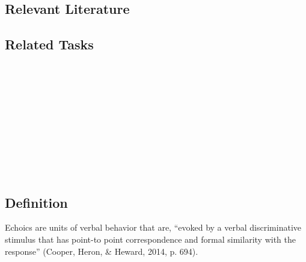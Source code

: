 \subsection{Relevant Literature}
\begin{refsection}
\nocite{test,alang2017police,clayton2018black}
\printbibliography[heading=none]
\end{refsection}
%
%
\subsection{Related Tasks}
\fourdTen{}\\
\fourdEleven{}\\
\fourdTwelve{}\\
\fourdThirteen{}\\
\fourdFourteen{}\\
\fourFKFourtyThree{}\\
\fourFKFourtyFour{}\\
\fourFKFourtyFive{}\\
\fourFKFourtySix{}\\
%
%
%
%
\section{\fourdTen{}}
\subsection{Definition} 
Echoics are units of verbal behavior that are, ``evoked by a verbal discriminative stimulus that has point-to point correspondence and formal similarity with the response'' (Cooper, Heron, \& Heward, 2014, p. 694).  

